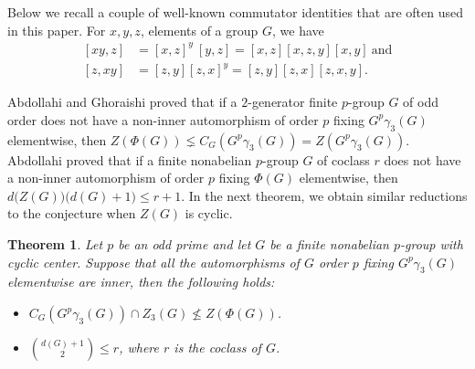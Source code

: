 \documentclass[preprint,sort&compress,12pt]{elsarticle}
\newtheorem{theorem}{Theorem}[section]
\theoremstyle{definition}
\numberwithin{equation}{theorem}
\begin{document}
Below we recall a couple of well-known commutator identities that are often used in this paper. For $x, y, z$, elements of a group $G$, we have
\begin{align}
\label{eq:4.1.1} [xy, z]&= [x, z]^y\ [y, z]= [x, z] [x, z, y] [x, y]\ \text{and}\\
\label{eq:4.1.2} [z, xy]&= [z, y] [z, x]^y= [z, y] [z, x] [z, x, y].
\end{align}

Abdollahi and Ghoraishi \cite[Theorem\ 1]{AG17} proved that if a $2$-generator finite $p$-group $G$ of odd order does not have a non-inner automorphism of order $p$ fixing $G^p\gamma_3(G)$ elementwise, then $Z(\Phi(G))\lneq C_G(G^p\gamma_3(G))=Z(G^p\gamma_3(G))$. Abdollahi \cite[Theorem\ 2.5]{A10} proved that if a finite nonabelian $p$-group $G$ of coclass $r$ does not have a non-inner automorphism of order $p$ fixing $\Phi(G)$ elementwise, then $d\big(Z(G)\big)\big(d(G)+1\big)\le r +1$. In the next theorem, we obtain similar reductions to the conjecture when $Z(G)$ is cyclic.

\begin{theorem}\label{th:4.2}
Let $p$ be an odd prime and let $G$ be a finite nonabelian $p$-group with cyclic center. Suppose that all the automorphisms of $G$ order $p$ fixing $G^p\gamma_3(G)$ elementwise are inner, then the following holds:
\begin{itemize} 
\item [$(i)$] $C_G(G^p\gamma_3(G))\cap Z_3(G)\not\le Z(\Phi(G))$.
\item [$(ii)$] ${{d(G)+1}\choose{2}}\le r$, where $r$ is the coclass of $G$.
\end{itemize}
\end{theorem}
\end{document}
